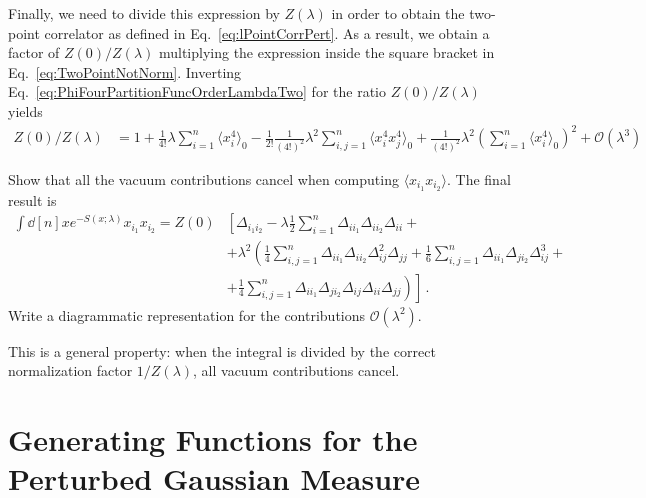 \documentclass[notes.tex]{subfiles}
\begin{document}
Finally, we need to divide this expression by $Z(\lambda)$ in order to
obtain the two-point correlator as defined in
Eq.~\ref{eq:lPointCorrPert}.  As a result, we obtain a factor of
$Z(0)/Z(\lambda)$ multiplying the expression inside the square bracket
in Eq.~\ref{eq:TwoPointNotNorm}. Inverting
Eq.~\ref{eq:PhiFourPartitionFuncOrderLambdaTwo} for the ratio
$Z(0)/Z(\lambda)$ yields
\begin{align}
 Z(0)/Z(\lambda) &= 
                    1 + \frac{1}{4!} \lambda \sum_{i=1}^n \langle x_i^4\rangle_0 
                    - \frac{1}{2!} \frac{1}{(4!)^2} \lambda^2 \sum_{i,j=1}^n 
                    \langle x_i^4 x_j^4\rangle_0 
                   + \frac{1}{(4!)^2} \lambda^2 \left(\sum_{i=1}^n \langle x_i^4\rangle_0\right)^2
                   + \mathcal{O}(\lambda^3) 
\end{align}

\begin{Ex}
  Show that all the vacuum contributions cancel when computing $\langle
  x_{i_1} x_{i_2}\rangle$. The final result is
  \begin{align}
  \int \dd[n]{x} e^{-S(x;\lambda)} 
  x_{i_1} x_{i_2} = Z(0) & 
                           \left[
                           \Delta_{i_1 i_2} - \lambda  \frac12 \sum_{i=1}^n
                           \Delta_{i i_1} \Delta_{i i_2} \Delta_{i i} 
                            + \right. \nonumber \\
                         & \left.
                           + \lambda^2 \left( 
                           \frac{1}{4} \sum_{i,j=1}^n \Delta_{i i_1}
                           \Delta_{i i_2} \Delta_{i j}^2 \Delta_{jj}
                           + \frac{1}{6} \sum_{i,j=1}^n \Delta_{i i_1}
                           \Delta_{j i_2} \Delta_{i j}^3 +
                           \right. \right. \nonumber \\
  \label{eq:TwoPointNorm}
                         & + \left. \left.
                           \frac{1}{4} \sum_{i,j=1}^n \Delta_{i i_1}
                           \Delta_{j i_2} \Delta_{i j} \Delta_{ii}\Delta_{jj}
                           \right)
                           \right]\, .
\end{align}
Write a diagrammatic representation for the contributions $\mathcal{O}(\lambda^2)$.
\end{Ex}
This is a general property: when the integral is divided by the
correct normalization factor $1/Z(\lambda)$, all vacuum contributions
cancel.

\section{Generating Functions for the Perturbed Gaussian Measure}
\label{sec:gener-funct-pert}
\end{document}
